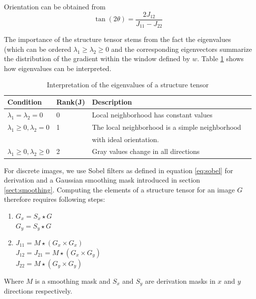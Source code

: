 	
		Orientation can be obtained from	
		\begin{equation}
			\tan(2\theta) = \dfrac{2 J_{12}}{J_{11} - J_{22}}
		\end{equation}
	
		The importance of the structure tensor stems from the fact the eigenvalues (which can be ordered $\lambda_1 \geq \lambda_2 \geq 0$ and the corresponding eigenvectors summarize the distribution of the gradient within the window defined by $w$. Table \ref{tab:struc_tensor_interp} shows how eigenvalues can be interpreted.
		
		\begin{table}
		
			\begin{tabular}{|l|l|l|p{5cm}| }
			\hline 
			\textbf{Condition} & \textbf{Rank(J)} & \textbf{Description }\\ 
			\hline 
			$ \lambda_1 = \lambda_2 = 0$  & 0 & Local neighborhood  has constant values\\ 
			\hline 
			$\lambda_1 \geq 0, \lambda_2 = 0 $ & 1 & The local neighborhood is a simple neighborhood \\
																				&  		& with ideal orientation.  \\ 
			\hline
			 $\lambda_1 \geq 0, \lambda_2 \geq 0 $ & 2 & Gray values change in all directions \\
			\hline
			\end{tabular} 
			
			\caption{Interpretation of the eigenvalues of a structure tensor}
			\label{tab:struc_tensor_interp}
		\end{table}
		
		
		For discrete images, we use Sobel filters as defined in equation \ref{eq:sobel} for derivation and a Gaussian smoothing mask introduced in section \ref{sect:smoothing}. Computing the elements of a structure tensor for an image $G$ therefore requires following steps:
		\begin{enumerate}
			\item $G_x = S_x \star G$ \\
						$G_y = S_y \star G$
			\item $J_{11} = M \star (G_x \times G_x)$ \\
						 $J_{12} = J_{21} = M \star (G_x \times G_y)$ \\
						 $J_{22} = M \star (G_y \times G_y)$
		\end{enumerate}
		Where $M$ is a smoothing mask and $S_x$ and $S_y$ are derivation masks in $x$ and $y$ directions respectively.

